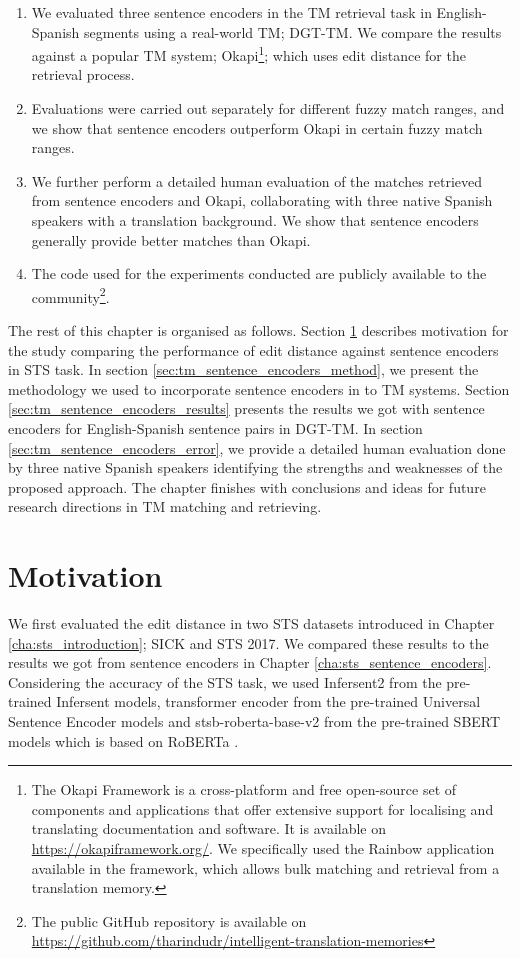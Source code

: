 \begin{enumerate}
	\item We evaluated three sentence encoders in the TM retrieval task in English-Spanish segments using a real-world TM; DGT-TM. We compare the results against a popular TM system; Okapi\footnote{The Okapi Framework is a cross-platform and free open-source set of components and applications that offer extensive support for localising and translating documentation and software. It is available on \url{https://okapiframework.org/}. We specifically used the Rainbow application available in the framework, which allows bulk matching and retrieval from a translation memory.}; which uses edit distance for the retrieval process.
	
	\item Evaluations were carried out separately for different fuzzy match ranges, and we show that sentence encoders outperform Okapi in certain fuzzy match ranges.
	
	\item We further perform a detailed human evaluation of the matches retrieved from sentence encoders and Okapi, collaborating with three native Spanish speakers with a translation background. We show that sentence encoders generally provide better matches than Okapi.
	
	\item The code used for the experiments conducted are publicly available to the community\footnote{The public GitHub repository is available on \url{https://github.com/tharindudr/intelligent-translation-memories}}.
\end{enumerate}

The rest of this chapter is organised as follows. Section \ref{sec:tm_sentence_encoders_motivation} describes motivation for the study comparing the performance of edit distance against sentence encoders in STS task. In section \ref{sec:tm_sentence_encoders_method}, we present the methodology we used to incorporate sentence encoders in to TM systems. Section \ref{sec:tm_sentence_encoders_results} presents the results we got with sentence encoders for English-Spanish sentence pairs in DGT-TM. In section \ref{sec:tm_sentence_encoders_error}, we provide a detailed human evaluation done by three native Spanish speakers identifying the strengths and weaknesses of the proposed approach. The chapter finishes with conclusions and ideas for future research directions in TM matching and retrieving.


\section{Motivation}
\label{sec:tm_sentence_encoders_motivation}
We first evaluated the edit distance in two STS datasets introduced in Chapter \ref{cha:sts_introduction}; SICK and STS 2017. We compared these results to the results we got from sentence encoders in Chapter \ref{cha:sts_sentence_encoders}. Considering the accuracy of the STS task, we used Infersent2 from the pre-trained Infersent models, transformer encoder from the pre-trained Universal Sentence Encoder models and stsb-roberta-base-v2 from the pre-trained SBERT models which is based on RoBERTa \autocite{liu2019roberta}. 

